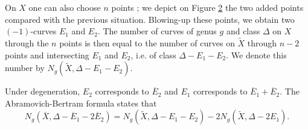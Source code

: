 \begin{rema}
\begin{figure}[ht]
	\caption{}
	\label{fig-blowupXtan}
\end{figure}
 

On $X$ one can also choose $n$ points ; we depict on Figure \ref{fig-blowupXpoint} the two added points compared with the previous situation. Blowing-up these points, we obtain two $(-1)$-curves $E_1$ and $E_2$. The number of curves of genus $g$ and class $\Delta$ on $X$ through the $n$ points is then equal to the number of curves on $\widetilde X$ through $n-2$ points and intersecting $E_1$ and $E_2$, i.e.  of class $\Delta-E_1-E_2$. We denote this number by $N_g(\widetilde X,\Delta-E_1-E_2)$. 
 

\begin{figure}[ht]
	\centering
{}
	\caption{}
	\label{fig-blowupXpoint}
\end{figure}

Under degeneration, $E_2$ corresponds to $\overline E_2$ and $E_1$ corresponds to $\overline E_1 + \overline E_2$. The Abramovich-Bertram formula \cite{abramovich-2001-formula, vakil-2000-counting, brugalle-2020-invariance, bousseau_refined_2021} states that
\[ N_g(\overline X, \Delta-\overline E_1 -2\overline E_2) = N_g(\widetilde X, \Delta-E_1-E_2) -2 N_g(\widetilde X,\Delta-2E_1) .\]


\end{rema}
